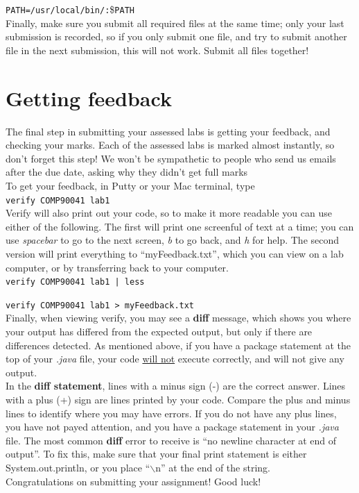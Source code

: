 \documentclass[]{article}
\begin{document}
\verb'PATH=/usr/local/bin/:'\$\verb'PATH'\\

Finally, make sure you submit all required files at the same time; only your last submission is recorded, so if you only submit one file, and try to submit another file in the next submission, this will not work. Submit all files together!

\section{Getting feedback}
\label{sec4}
The final step in submitting your assessed labs is getting your feedback, and checking your marks. Each of the assessed labs is marked almost instantly, so don't forget this step! We won't be sympathetic to people who send us emails after the due date, asking why they didn't get full marks \smiley{} \\

To get your feedback, in Putty or your Mac terminal, type\\

\verb'verify COMP90041 lab1'\\

Verify will also print out your code, so to make it more readable you can use either of the following. The first will print one screenful of text at a time; you can use \textit{spacebar} to go to the next screen, \textit{b} to go back, and \textit{h} for help. The second version will print everything to ``myFeedback.txt'', which you can view on a lab computer, or by transferring back to your computer.\\

\verb'verify COMP90041 lab1 | less'

\verb'verify COMP90041 lab1 > myFeedback.txt'\\

Finally, when viewing verify, you may see a \textbf{diff} message, which shows you where your output has differed from the expected output, but only if there are differences detected. As mentioned above, if you have a package statement at the top of your \textit{.java} file, your code \underline{will not} execute correctly, and will not give any output.\\

In the \textbf{diff statement}, lines with a minus sign (-) are the correct answer. Lines with a plus (+) sign are lines printed by your code. Compare the plus and minus lines to identify where you may have errors. If you do not have any plus lines, you have not payed attention, and you have a package statement in your \textit{.java} file. The most common \textbf{diff} error to receive is ``no newline character at end of output''. To fix this, make sure that your final print statement is either System.out.println, or you place ``$\backslash$n'' at the end of the string.\\

Congratulations on submitting your assignment! Good luck!
\end{document}
